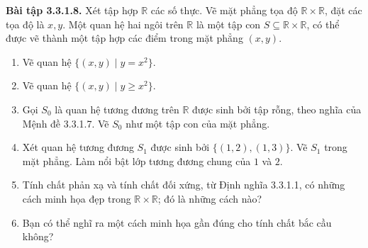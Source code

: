 \noindent\textbf{Bài tập 3.3.1.8.} Xét tập hợp $\mathbb R$ các số thực. Vẽ mặt phẳng tọa độ $\mathbb R\times\mathbb R$, đặt các tọa độ là $x,y$. Một quan hệ hai ngôi trên $\mathbb R$ là một tập con $S\subseteq\mathbb R\times\mathbb R$, có thể được vẽ thành một tập hợp các điểm trong mặt phẳng $(x,y)$.
\begin{enumerate}[label=\alph*.]
\item Vẽ quan hệ $\{(x,y)\mid y=x^2\}$.
\item Vẽ quan hệ $\{(x,y)\mid y\ge x^2\}$.
\item Gọi $S_0$ là quan hệ tương đương trên $\mathbb R$ được sinh bởi tập rỗng, theo nghĩa của Mệnh đề 3.3.1.7. Vẽ $S_0$ như một tập con của mặt phẳng.
\item Xét quan hệ tương đương $S_1$ được sinh bởi $\{(1,2),(1,3)\}$. Vẽ $S_1$ trong mặt phẳng. Làm nổi bật lớp tương đương chung của $1$ và $2$.
\item Tính chất phản xạ và tính chất đối xứng, từ Định nghĩa 3.3.1.1, có những cách minh họa đẹp trong $\mathbb R\times\mathbb R$; đó là những cách nào?
\item Bạn có thể nghĩ ra một cách minh họa gần đúng cho tính chất bắc cầu không?
\end{enumerate}


